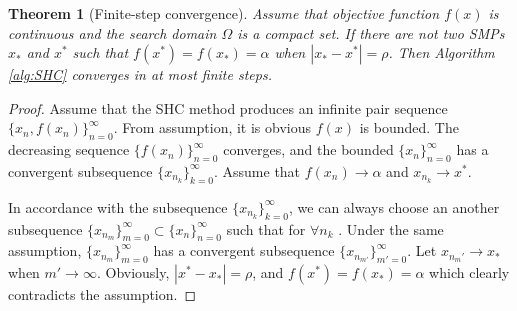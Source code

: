 \documentclass[preprint,12pt]{elsarticle}
\newtheorem{theorem}{Theorem}
\begin{document}
\begin{theorem}[Finite-step convergence]
	Assume that objective function $f(x)$ is continuous and the
	search domain $\Omega$ is a compact set.
	If there are not two SMPs $x_*$ and $x^*$ such that
	$f(x^*)=f(x_*)=\alpha$ when $|x_*-x^*|=\rho$.
	Then Algorithm \ref{alg:SHC} converges in at most finite steps.

\end{theorem}
\begin{proof}
	Assume that the SHC method produces an infinite pair sequence
	$\{x_n, f(x_n)\}_{n=0}^{\infty}$. From assumption,
	it is obvious $f(x)$ is bounded. The decreasing sequence
	$\{f(x_n)\}_{n=0}^\infty$ converges, and the bounded
	$\{x_n\}_{n=0}^\infty$ has a convergent subsequence 
	$\{x_{n_k}\}_{k=0}^\infty$. Assume that $f(x_n)\rightarrow
	\alpha$ and $x_{n_k}\rightarrow x^*$. 
	
	In accordance with the subsequence $\{x_{n_k}\}_{k=0}^\infty$, we can
	always choose an another subsequence
	$\{x_{n_m}\}_{m=0}^\infty\subset \{x_n\}_{n=0}^{\infty}$ such that 
	for $\forall n_k$ . Under the same assumption,
	$\{x_{n_m}\}_{m=0}^\infty$ has a convergent subsequence
	$\{x_{n_{m'}}\}_{m'=0}^\infty$. Let $x_{n_m'} \rightarrow
	x_*$ when $m'\rightarrow \infty$. 
	Obviously, $|x^*-x_*|=\rho$, and $f(x^*)=f(x_*)=\alpha$ 
	which clearly contradicts the assumption.
\end{proof}
\end{document}
